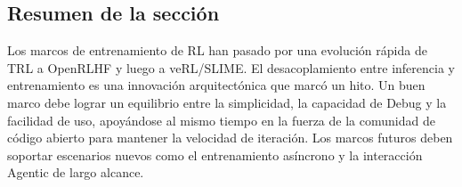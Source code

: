 \subsection{Resumen de la sección}

Los marcos de entrenamiento de RL han pasado por una evolución rápida de TRL a OpenRLHF y luego a veRL/SLIME. El desacoplamiento entre inferencia y entrenamiento es una innovación arquitectónica que marcó un hito. Un buen marco debe lograr un equilibrio entre la simplicidad, la capacidad de Debug y la facilidad de uso, apoyándose al mismo tiempo en la fuerza de la comunidad de código abierto para mantener la velocidad de iteración. Los marcos futuros deben soportar escenarios nuevos como el entrenamiento asíncrono y la interacción Agentic de largo alcance.

